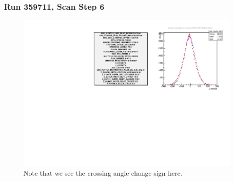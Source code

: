 \begin{frame}
\frametitle{Run 359711, Scan Step 6}
\begin{figure}
\begin{center}
\includegraphics[width=\linewidth]{"figs/359711_step_6_zdc_zvertex"}
\caption{Note that we see the crossing angle change sign here.}
\label{fig:359711_step_6_zdc_zvertex}
\end{center}\end{figure}
\end{frame}

